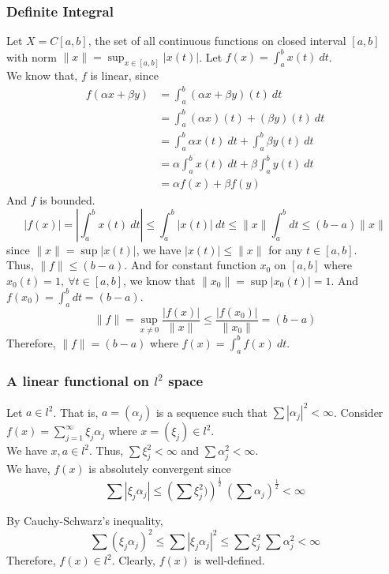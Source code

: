 \subsubsection{Definite Integral}
		Let $X = C[a,b]$, the set of all continuous functions on closed interval $[a,b]$ with norm $\|x\| = \sup_{x \in [a,b]} |x(t)|$.
		Let $f(x) = \int_a^b x(t)\ dt$.\\

		We know that, $f$ is linear, since 
		\begin{align*}
			f(\alpha x+\beta y) 
			& = \int_a^b (\alpha x + \beta y)(t)\ dt \\ 
			& = \int_a^b (\alpha x)(t) + (\beta y)(t)\ dt \\ 
			& = \int_a^b \alpha x(t) \ dt + \int_a^b \beta y(t)\ dt \\
			& = \alpha \int_a^b x(t) \ dt + \beta \int_a^b y(t)\ dt \\
			& = \alpha f(x) + \beta f(y)
		\end{align*}
		And $f$ is bounded.
		\[ |f(x)| = \left| \int_a^b x(t)\ dt \right| \le \int_a^b |x(t)|\ dt \le \|x\| \int_a^b dt \le (b-a)\|x\| \]
		since $\|x\| = \sup |x(t)|$, we have $|x(t)| \le \|x\|$ for any $t \in [a,b]$.\\

		Thus, $\|f\| \le (b-a)$.
		And for constant function $x_0$ on $[a,b]$ where $x_0(t) = 1,\ \forall t \in [a,b]$, we know that $\|x_0\| = \sup |x_0(t)| = 1$.
		And $f(x_0) = \int_a^b dt = (b-a)$.
		\[ \|f\| = \sup_{x \ne 0} \frac{|f(x)|}{\|x\|} \le \frac{|f(x_0)|}{\|x_0\|} = (b-a) \]
		Therefore, $\|f\| = (b-a)$ where $f(x) = \int_a^b f(x)\ dt$.

\subsubsection{A linear functional on $l^2$ space}
		Let $a \in l^2$. 
		That is, $a = (\alpha_j)$ is a sequence such that $\sum |\alpha_j|^2 < \infty$.
		Consider $\displaystyle f(x) = \sum_{j=1}^\infty \xi_j \alpha_j$ where $x = (\xi_j) \in l^2$.\\
		We have $x,a \in l^2$.
		Thus, $\sum \xi_j^2 < \infty$ and $\sum \alpha_j^2 < \infty$.\\

		We have, $f(x)$ is absolutely convergent since
		\[ \sum |\xi_j\alpha_j| \le \left(\sum \xi_j^2)\right)^\frac{1}{2} \ \left(\sum \alpha_j \right)^\frac{1}{2} < \infty \]

		By Cauchy-Schwarz's inequality,
		\[ \sum (\xi_j\alpha_j)^2 \le \sum |\xi_j\alpha_j|^2 \le \sum \xi_j^2\ \sum \alpha_j^2 < \infty \]
		Therefore, $f(x) \in l^2$.
		Clearly, $f(x)$ is well-defined.\\

